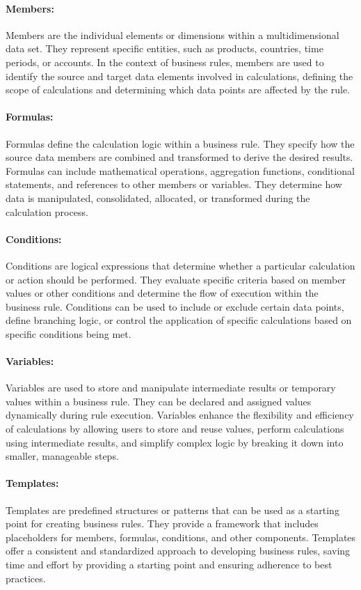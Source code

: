 \documentclass[12pt,a4paper,openright,twoside]{book}
\begin{document}
\paragraph{Members:}
Members are the individual elements or dimensions within a multidimensional data set. 
%
They represent specific entities, such as products, countries, time periods, or accounts. 
%
In the context of business rules, members are used to identify the source and target data elements involved in calculations, defining the scope of calculations and determining which data points are affected by the rule.

\paragraph{Formulas:}
Formulas define the calculation logic within a business rule.
%
They specify how the source data members are combined and transformed to derive the desired results.
%
Formulas can include mathematical operations, aggregation functions, conditional statements, and references to other members or variables. 
%
They determine how data is manipulated, consolidated, allocated, or transformed during the calculation process.

\paragraph{Conditions:}
Conditions are logical expressions that determine whether a particular calculation or action should be performed. 
%
They evaluate specific criteria based on member values or other conditions and determine the flow of execution within the business rule. 
%
Conditions can be used to include or exclude certain data points, define branching logic, or control the application of specific calculations based on specific conditions being met.

\paragraph{Variables:}
Variables are used to store and manipulate intermediate results or temporary values within a business rule. %
They can be declared and assigned values dynamically during rule execution. 
%
Variables enhance the flexibility and efficiency of calculations by allowing users to store and reuse values, perform calculations using intermediate results, and simplify complex logic by breaking it down into smaller, manageable steps.

\paragraph{Templates:}
Templates are predefined structures or patterns that can be used as a starting point for creating business rules. 
%
They provide a framework that includes placeholders for members, formulas, conditions, and other components. 
%
Templates offer a consistent and standardized approach to developing business rules, saving time and effort by providing a starting point and ensuring adherence to best practices.
\end{document}
